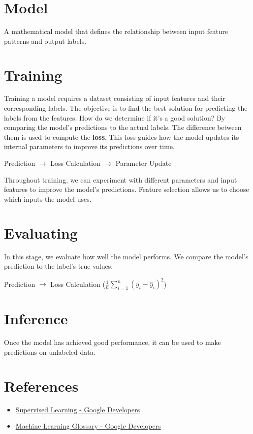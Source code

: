 \documentclass[a4paper,12pt]{article}
\begin{document}
\section*{Model}
A mathematical model that defines the relationship between input feature patterns and output labels.

\section*{Training}
Training a model requires a dataset consisting of input features and their corresponding labels. The objective is to find the best solution for predicting the labels from the features. How do we determine if it's a good solution? By comparing the model's predictions to the actual labels. The difference between them is used to compute the \textbf{loss}. This loss guides how the model updates its internal parameters to improve its predictions over time. \newline

\noindent Prediction $\rightarrow$ Loss Calculation $\rightarrow$ Parameter Update

\noindent Throughout training, we can experiment with different parameters and input features to improve the model's predictions. Feature selection allows us to choose which inputs the model uses.

\section*{Evaluating}
In this stage, we evaluate how well the model performs. We compare the model's prediction to the label's true values. \newline

\noindent Prediction $\rightarrow$ Loss Calculation ($\frac{1}{n} \sum_{i=1}^{n} (y_i - \hat{y}_i)^2$)

\section*{Inference}
Once the model has achieved good performance, it can be used to make predictions on unlabeled data.

\section*{References}
\begin{itemize}
    \item \href{https://developers.google.com/machine-learning/intro-to-ml/supervised}{Supervised Learning - Google Developers}
    \item \href{https://developers.google.com/machine-learning/glossary}{Machine Learning Glossary - Google Developers}
\end{itemize}
\end{document}
